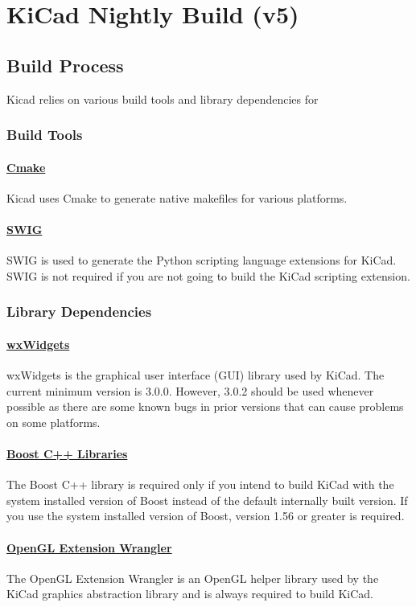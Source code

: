 \documentclass[12pt,a4paper]{report}
\begin{document}
\chapter{\textbf{KiCad Nightly Build (v5)}}
\section{Build Process}
Kicad relies on various build tools and library dependencies for 
\subsection{Build Tools}
\subsubsection{\href{https://cmake.org/}{Cmake}}
Kicad uses Cmake to generate native makefiles for various platforms.
\subsubsection{\href{http://www.swig.org/}{SWIG}}
SWIG is used to generate the Python scripting language extensions for KiCad. SWIG is not required if you are not going to build the KiCad scripting extension.
\subsection{Library Dependencies}
\subsubsection{\href{https://www.wxwidgets.org/}{wxWidgets}}
wxWidgets is the graphical user interface (GUI) library used by KiCad. The current minimum version is 3.0.0. However, 3.0.2 should be used whenever possible as there are some known bugs in prior versions that can cause problems on some platforms.
\subsubsection{\href{http://www.boost.org/}{Boost C++ Libraries}}
The Boost C++ library is required only if you intend to build KiCad with the system installed version of Boost instead of the default internally built version. If you use the system installed version of Boost, version 1.56 or greater is required.
\subsubsection{\href{http://glew.sourceforge.net/}{OpenGL Extension Wrangler}}
The OpenGL Extension Wrangler is an OpenGL helper library used by the KiCad graphics abstraction library and is always required to build KiCad.
\end{document}
